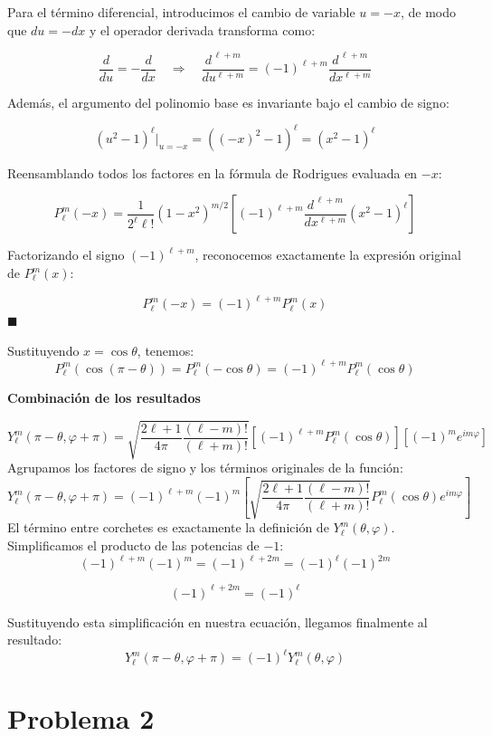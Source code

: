 \documentclass[a4paper]{article}
\begin{document}
\begin{enumerate}[a)]
Para el término diferencial, introducimos el cambio de variable $u = -x$, de modo que $du = -dx$ y el operador derivada transforma como:

$$
\frac{d}{du} = -\frac{d}{dx} \quad \Longrightarrow \quad \frac{d^{\,\ell+m}}{du^{\ell+m}} = (-1)^{\ell+m} \frac{d^{\,\ell+m}}{dx^{\ell+m}}
$$

Además, el argumento del polinomio base es invariante bajo el cambio de signo:

$$
(u^2 - 1)^\ell \big|_{u=-x} = ((-x)^2 - 1)^\ell = (x^2 - 1)^\ell
$$

Reensamblando todos los factores en la fórmula de Rodrigues evaluada en $-x$:

$$
P_\ell^m(-x) = \frac{1}{2^\ell \ell!} (1-x^2)^{m/2} \left[ (-1)^{\ell+m} \frac{d^{\,\ell+m}}{dx^{\ell+m}} (x^2 - 1)^\ell \right]
$$

Factorizando el signo $(-1)^{\ell+m}$, reconocemos exactamente la expresión original de $P_\ell^m(x)$:

$$
P_\ell^m(-x) = (-1)^{\ell+m} P_\ell^m(x)
$$
\hfill $\blacksquare$

Sustituyendo $x = \cos\theta$, tenemos:
$$
P_\ell^m(\cos(\pi - \theta)) = P_\ell^m(-\cos\theta) = (-1)^{\ell+m} P_\ell^m(\cos\theta)
$$

\textbf{Combinación de los resultados} 

$$
Y_\ell^m(\pi - \theta, \varphi + \pi) = \sqrt{\frac{2\ell+1}{4\pi} \frac{(\ell-m)!}{(\ell+m)!}} \left[ (-1)^{\ell+m} P_\ell^m(\cos\theta) \right] \left[ (-1)^m e^{im\varphi} \right]
$$
Agrupamos los factores de signo y los términos originales de la función:
$$
Y_\ell^m(\pi - \theta, \varphi + \pi) = (-1)^{\ell+m} (-1)^m \left[ \sqrt{\frac{2\ell+1}{4\pi} \frac{(\ell-m)!}{(\ell+m)!}} P_\ell^m(\cos\theta) e^{im\varphi} \right]
$$
El término entre corchetes es exactamente la definición de $Y_\ell^m(\theta, \varphi)$. Simplificamos el producto de las potencias de $-1$:
$$
(-1)^{\ell+m} (-1)^m = (-1)^{\ell+2m} = (-1)^\ell (-1)^{2m}
$$

$$
(-1)^{\ell+2m} = (-1)^\ell
$$

Sustituyendo esta simplificación en nuestra ecuación, llegamos finalmente al resultado:
$$
Y_\ell^m(\pi - \theta, \varphi + \pi) = (-1)^\ell Y_\ell^m(\theta, \varphi)
$$
\end{enumerate}

\section{Problema 2}
\end{document}
